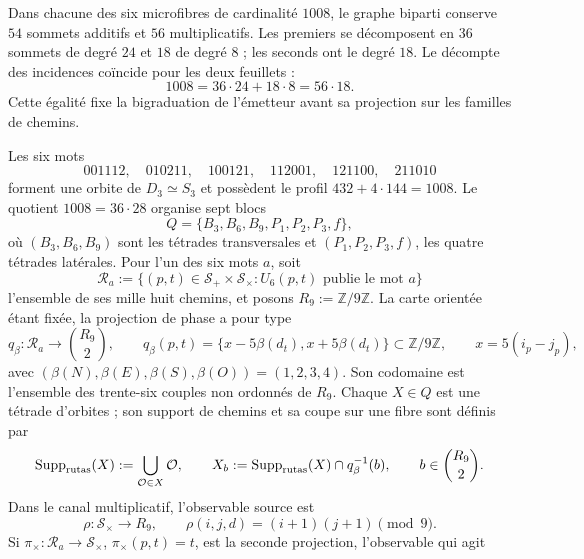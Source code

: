Dans chacune des six microfibres de cardinalité \(1008\), le graphe
biparti conserve \(54\) sommets additifs et \(56\) multiplicatifs. Les
premiers se décomposent en \(36\) sommets de degré \(24\) et \(18\) de
degré \(8\) ; les seconds ont le degré \(18\). Le décompte des incidences
coïncide pour les deux feuillets :
\begin{equation}
 1008=36\cdot24+18\cdot8=56\cdot18.
 \label{eq:bidegraduacion-microfibra-masas-autonoma}
\end{equation}
Cette égalité fixe la bigraduation de l'émetteur avant sa projection sur
les familles de chemins.

Les six mots
\begin{equation}
 001112,\quad010211,\quad100121,\quad112001,\quad121100,\quad211010
 \label{eq:seis-palabras-microfibra-masas-autonoma}
\end{equation}
forment une orbite de \(D_3\simeq S_3\) et possèdent le profil
\(432+4\cdot144=1008\). Le quotient \(1008=36\cdot28\) organise sept
blocs
\[
 Q=\{B_3,B_6,B_9,P_1,P_2,P_3,f\},
\]
où \((B_3,B_6,B_9)\) sont les tétrades transversales et
\((P_1,P_2,P_3,f)\), les quatre tétrades latérales. Pour l'un des six
mots \(a\), soit
\[
 \mathcal R_a
 :=\{(p,t)\in\mathcal S_+\times\mathcal S_\times:
       U_6(p,t)\text{ publie le mot }a\}
\]
l'ensemble de ses mille huit chemins, et posons
\(R_9:=\mathbb Z/9\mathbb Z\). La carte orientée étant fixée, la projection
de phase a pour type
\begin{equation}
 q_\beta:\mathcal R_a\longrightarrow\binom{R_9}{2},
 \qquad
 q_\beta(p,t)
 =\{x-5\beta(d_t),x+5\beta(d_t)\}\subset\mathbb Z/9\mathbb Z,
 \qquad x=5(i_p-j_p),
 \label{eq:proyeccion-fano-semillas-masas-autonoma}
\end{equation}
avec \((\beta(N),\beta(E),\beta(S),\beta(O))=(1,2,3,4)\). Son codomaine est
l'ensemble des trente-six couples non ordonnés de \(R_9\). Chaque
\(X\in Q\) est une tétrade d'orbites ;
son support de chemins et sa coupe sur une fibre sont définis par
\[
 \operatorname{Supp}_{\rm rutas}(X)
 :=\bigcup_{\mathcal O\in X}\mathcal O,
 \qquad
 X_b:=\operatorname{Supp}_{\rm rutas}(X)\cap q_\beta^{-1}(b),
 \qquad b\in\binom{R_9}{2}.
\]
Dans le canal multiplicatif, l'observable source est
\begin{equation}
 \rho:\mathcal S_\times\longrightarrow R_9,
 \qquad
 \rho(i,j,d)=(i+1)(j+1)\pmod9.
 \label{eq:residuo-producto-fano-semillas-rev3}
\end{equation}
Si \(\pi_\times:\mathcal R_a\to\mathcal S_\times\),
\(\pi_\times(p,t)=t\), est la seconde projection, l'observable qui agit
